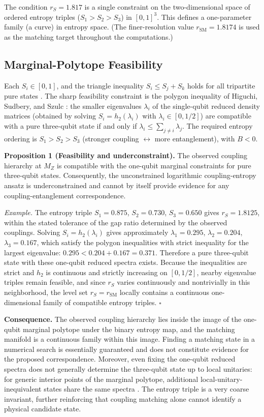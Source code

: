 \documentclass[11pt]{article}
\newcommand{\rSM}{r_{\mathrm{SM}}}
\begin{document}
The condition $r_S = 1.817$ is a single constraint on the two-dimensional space of ordered entropy triples ($S_1 > S_2 > S_3$) in $[0,1]^3$. This defines a one-parameter family (a curve) in entropy space. (The finer-resolution value $\rSM = 1.8174$ is used as the matching target throughout the computations.)

\subsection{Marginal-Polytope Feasibility}
\label{sec:feasibility}

Each $S_i \in [0, 1]$, and the triangle inequality $S_i \le S_j + S_k$ holds for all tripartite pure states \cite{nielsen}. The sharp feasibility constraint is the polygon inequality of Higuchi, Sudbery, and Szulc \cite{higuchi}: the smaller eigenvalues $\lambda_i$ of the single-qubit reduced density matrices (obtained by solving $S_i = h_2(\lambda_i)$ with $\lambda_i \in [0, 1/2]$) are compatible with a pure three-qubit state if and only if $\lambda_i \le \sum_{j \ne i} \lambda_j$. The required entropy ordering is $S_1 > S_2 > S_3$ (stronger coupling $\leftrightarrow$ more entanglement), with $B < 0$.

\textbf{Proposition 1 (Feasibility and underconstraint).} The observed coupling hierarchy at $M_Z$ is compatible with the one-qubit marginal constraints for pure three-qubit states. Consequently, the unconstrained logarithmic coupling-entropy ansatz is underconstrained and cannot by itself provide evidence for any coupling-entanglement correspondence.

\emph{Example.} The entropy triple $S_1 = 0.875$, $S_2 = 0.730$, $S_3 = 0.650$ gives $r_S = 1.8125$, within the stated tolerance of the gap ratio determined by the observed couplings. Solving $S_i = h_2(\lambda_i)$ gives approximately $\lambda_1 = 0.295$, $\lambda_2 = 0.204$, $\lambda_3 = 0.167$, which satisfy the polygon inequalities with strict inequality for the largest eigenvalue: $0.295 < 0.204 + 0.167 = 0.371$. Therefore a pure three-qubit state with these one-qubit reduced spectra exists. Because the inequalities are strict and $h_2$ is continuous and strictly increasing on $[0, 1/2]$, nearby eigenvalue triples remain feasible, and since $r_S$ varies continuously and nontrivially in this neighborhood, the level set $r_S = \rSM$ locally contains a continuous one-dimensional family of compatible entropy triples. \hfill$\square$

\textbf{Consequence.} The observed coupling hierarchy lies inside the image of the one-qubit marginal polytope under the binary entropy map, and the matching manifold is a continuous family within this image. Finding a matching state in a numerical search is essentially guaranteed and does not constitute evidence for the proposed correspondence. Moreover, even fixing the one-qubit reduced spectra does not generally determine the three-qubit state up to local unitaries: for generic interior points of the marginal polytope, additional local-unitary-inequivalent states share the same spectra \cite{sawicki}. The entropy triple is a very coarse invariant, further reinforcing that coupling matching alone cannot identify a physical candidate state.
\end{document}
